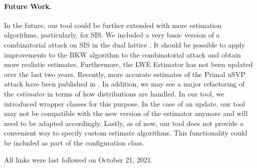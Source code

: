 \documentclass[
  a4paper,  %
  twoside,  %
  bibliography=totoc,
  headsepline,
  cleardoublepage=empty,
  parskip=half,
  draft=false
]{scrbook}
\begin{document}
\paragraph{Future Work.} In the future, our tool could be further extended with more estimation algorithms, particularly, for SIS. We included a very basic version of a combinatorial attack on SIS in the dual lattice \cite{MR09}. It should be possible to apply improvements to the BKW algorithm to the combinatorial attack and obtain more realistic estimates. Furthermore, the LWE Estimator \cite{APS15} has not been updated over the last two years. Recently, more accurate estimates of the Primal uSVP attack have been published in \cite{PV21}. In addition, we may see a major refactoring of the \textit{estimator} in terms of how distributions are handled. In our tool, we introduced wrapper classes for this purpose. In the case of an update, our tool may not be compatible with the new version of the estimator anymore and will need to be adapted accordingly.
Lastly, as of now, our tool does not provide a convenient way to specify custom estimate algorithms. This functionality could be included as part of the configuration class.


\printbibliography

All links were last followed on October 21, 2021.

\appendix
{}


\pagestyle{empty}
\renewcommand*{\chapterpagestyle}{empty}
\Versicherung
\end{document}
